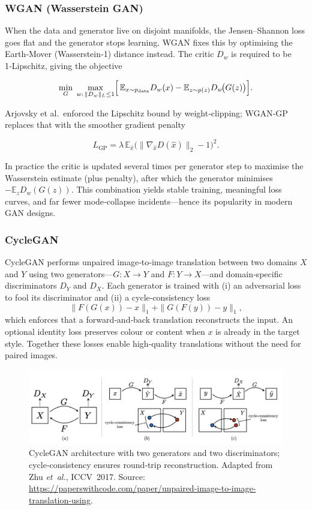 \documentclass{article}
\begin{document}
\subsubsection{WGAN (Wasserstein GAN)}

When the data and generator live on disjoint manifolds, the Jensen–Shannon loss goes flat and the generator stops learning.  WGAN fixes this by optimising the Earth‑Mover (Wasserstein‑1) distance instead.  The critic \(D_w\) is required to be 1‑Lipschitz, giving the objective

\[
\min_{G}\;\max_{w:\,\|D_w\|_{L}\le 1}
\Bigl[\,
\mathbb{E}_{x\sim p_{\mathrm{data}}} D_w(x)
-\mathbb{E}_{z\sim p(z)} D_w\!\bigl(G(z)\bigr)
\Bigr].
\]

Arjovsky et al.\ enforced the Lipschitz bound by weight‑clipping; WGAN‑GP replaces that with the smoother gradient penalty  

\[
L_{\mathrm{GP}}
=\lambda\,\mathbb{E}_{\hat x}\bigl(\|\nabla_{\hat x} D(\hat x)\|_2-1\bigr)^2.
\]

In practice the critic is updated several times per generator step to maximise the Wasserstein estimate (plus penalty), after which the generator minimises \(-\mathbb{E}_{z}D_w(G(z))\).  This combination yields stable training, meaningful loss curves, and far fewer mode‑collapse incidents—hence its popularity in modern GAN designs.

\subsubsection{CycleGAN}
CycleGAN performs unpaired image‑to‑image translation between two domains \(X\) and \(Y\) using two generators—\(G\!:\!X\!\rightarrow\!Y\) and \(F\!:\!Y\!\rightarrow\!X\)—and domain‑specific discriminators \(D_Y\) and \(D_X\).  
Each generator is trained with (i) an adversarial loss to fool its discriminator and (ii) a cycle‑consistency loss
\[
  \|F(G(x))-x\|_1 + \|G(F(y))-y\|_1,
\]
which enforces that a forward‑and‑back translation reconstructs the input.  
An optional identity loss preserves colour or content when \(x\) is already in the target style.  
Together these losses enable high‑quality translations without the need for paired images.

\begin{figure}[ht]
    \centering
    \includegraphics[width=0.85\linewidth]{graphics/S9GAN/cyclegan.png}
    \caption{CycleGAN architecture with two generators and two discriminators; cycle‑consistency ensures round‑trip reconstruction.  
    Adapted from Zhu \textit{et al.}, ICCV 2017.  
    Source: \url{https://paperswithcode.com/paper/unpaired-image-to-image-translation-using}.}
    \label{fig:cyclegan_overview}
\end{figure}
\end{document}
